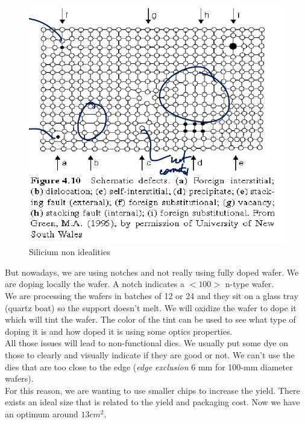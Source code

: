 \documentclass{report}
\begin{document}
\newpage
\begin{figure}
    \centering
    \includegraphics[width=0.95\linewidth]{silicium_non_idealities.png}
    \caption{Silicium non idealities}
    \label{fig:si-non-idealities-label}
\end{figure}

But nowadays, we are using notches and not really using fully doped wafer. We are doping locally the wafer. A notch indicates a $<100>$ n-type wafer.\\ 

We are processing the wafers in batches of 12 or 24 and they sit on a glass tray (quartz boat) so the support doesn't melt. We will oxidize the wafer to dope it which will tint the wafer. The color of the tint can be used to see what type of doping it is and how doped it is using some optics properties.\\

All those issues will lead to non-functional dies. We usually put some dye on those to clearly and visually indicate if they are good or not. We can't use the dies that are too close to the edge (\textit{edge exclusion} 6 mm for 100-mm diameter wafers).\\

For this reason, we are wanting to use smaller chips to increase the yield. There exists an ideal size that is related to the yield and packaging cost. Now we have an optimum around $13 cm^2$.
\end{document}
